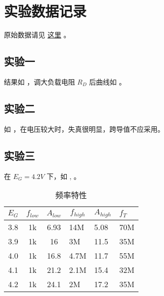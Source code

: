 \documentclass[lang=cn,11pt,a4paper,cite=authoryear]{elegantpaper}
\begin{document}

\section{实验数据记录}

原始数据请见 \href{https://github.com/PannenetsF/Mirco-Electronic-Device-Experiment/tree/main/homework/hw10}{这里} 。

\subsection{实验一}

结果如  ，调大负载电阻 \(R_D\) 后曲线如  。



\subsection{实验二}

如  ，在电压较大时，失真很明显，跨导值不应采用。


\subsection{实验三}

在 \(E_G = 4.2 V\) 下，如 ,  。



\begin{table}[htb]
\centering
\caption{频率特性}
\label{t1}
\begin{tabular}{ccclll}
\toprule
\(E_G\) & \(f_{low}\) & \(A_{low}\) & \multicolumn{1}{c}{\(f_{high}\)} & \multicolumn{1}{c}{\(A_{high}\)} & \(f_T\) \\
\midrule
3.8     & 1k          & 6.93        & 14M                              & 5.08                             & 70M     \\
3.9     & 1k          & 16          & 3M                               & 11.5                             & 35M     \\
4.0     & 1k          & 16.8        & 4.7M                             & 11.7                             & 55M     \\
4.1     & 1k          & 21.2        & 2.1M                             & 15.4                             & 32M     \\
4.2     & 1k          & 24.1        & 2M                               & 17.2                             & 35M    \\ 
\bottomrule
\end{tabular}
\end{table}
\end{document}
